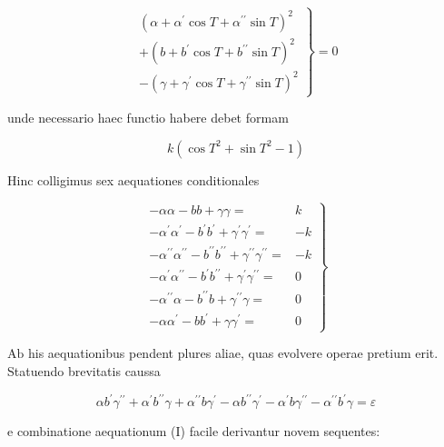\documentclass[twoside,12pt, showframe]{memoir}
\begin{document}
\[
\left.\begin{array}{r}
\left(\alpha+\alpha^{\prime} \cos T+\alpha^{\prime \prime} \sin T\right)^{2} \\
+\left(b+b^{\prime} \cos T+b^{\prime \prime} \sin T\right)^{2} \\
-\left(\gamma+\gamma^{\prime} \cos T+\gamma^{\prime \prime} \sin T\right)^{2}
\end{array}\right\}=0
\]

unde necessario haec functio habere debet formam

\[
k\left(\cos T^{2}+\sin T^{2}-1\right)
\]

Hinc colligimus sex aequationes conditionales

\[
\left.\begin{array}{lr}
-\alpha \alpha-b b+\gamma \gamma= & k \\
-\alpha^{\prime} \alpha^{\prime}-b^{\prime} b^{\prime}+\gamma^{\prime} \gamma^{\prime}= & -k \\
-\alpha^{\prime \prime} \alpha^{\prime \prime}-b^{\prime \prime} b^{\prime \prime}+\gamma^{\prime \prime} \gamma^{\prime \prime}= & -k \\
-\alpha^{\prime} \alpha^{\prime \prime}-b^{\prime} b^{\prime \prime}+\gamma^{\prime} \gamma^{\prime \prime}= & 0 \\
-\alpha^{\prime \prime} \alpha-b^{\prime \prime} b+\gamma^{\prime \prime} \gamma= & 0 \\
-\alpha \alpha^{\prime}-b b^{\prime}+\gamma \gamma^{\prime}= & 0
\end{array}\right\}
\]

\(\mathrm{Ab}\) his aequationibus pendent plures aliae, quas evolvere operae pretium erit. Statuendo brevitatis caussa

\[
\alpha b^{\prime} \gamma^{\prime \prime}+\alpha^{\prime} b^{\prime \prime} \gamma+\alpha^{\prime \prime} b \gamma^{\prime}-\alpha b^{\prime \prime} \gamma^{\prime}-\alpha^{\prime} b \gamma^{\prime \prime}-\alpha^{\prime \prime} b^{\prime} \gamma=\varepsilon
\]

e combinatione aequationum (I) facile derivantur novem sequentes:
\end{document}

